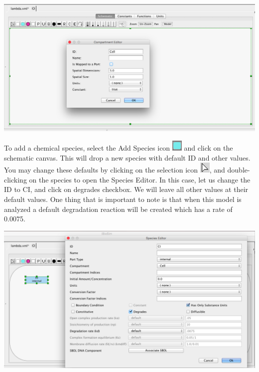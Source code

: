 \documentclass[titlepage,11pt]{article}
\begin{document}
\begin{center}
\includegraphics[width=160mm]{screenshots/compartment}
\end{center}

To add a chemical species, select the Add Species icon \includegraphics{../gui/icons/modelview/add_species_selected} and click on the schematic canvas.  This will drop a new species with default ID and other values.  You may change these defaults by clicking on the selection icon 
\includegraphics{../gui/icons/modelview/select_mode_selected}, and
double-clicking on the species to open the Species Editor.  In this case, let us change the ID to CI, and click on degrades checkbox.  We will leave all other values at their default values.  One thing that is important to note is that when this model is analyzed a default degradation reaction will be created which has a rate of 0.0075.  

\begin{center}
\includegraphics[width=160mm]{screenshots/species}
\end{center}
\end{document}
